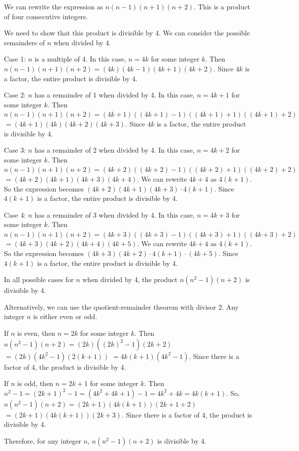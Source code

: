 \documentclass{article}
\begin{document}
We can rewrite the expression as $n(n-1)(n+1)(n+2)$. This is a product of four consecutive integers.

We need to show that this product is divisible by 4. We can consider the possible remainders of $n$ when divided by 4.

Case 1: $n$ is a multiple of 4.
In this case, $n = 4k$ for some integer $k$.
Then $n(n-1)(n+1)(n+2) = (4k)(4k-1)(4k+1)(4k+2)$.
Since $4k$ is a factor, the entire product is divisible by 4.

Case 2: $n$ has a remainder of 1 when divided by 4.
In this case, $n = 4k+1$ for some integer $k$.
Then $n(n-1)(n+1)(n+2) = (4k+1)((4k+1)-1)((4k+1)+1)((4k+1)+2)$
$= (4k+1)(4k)(4k+2)(4k+3)$.
Since $4k$ is a factor, the entire product is divisible by 4.

Case 3: $n$ has a remainder of 2 when divided by 4.
In this case, $n = 4k+2$ for some integer $k$.
Then $n(n-1)(n+1)(n+2) = (4k+2)((4k+2)-1)((4k+2)+1)((4k+2)+2)$
$= (4k+2)(4k+1)(4k+3)(4k+4)$.
We can rewrite $4k+4$ as $4(k+1)$.
So the expression becomes $(4k+2)(4k+1)(4k+3) \cdot 4(k+1)$.
Since $4(k+1)$ is a factor, the entire product is divisible by 4.

Case 4: $n$ has a remainder of 3 when divided by 4.
In this case, $n = 4k+3$ for some integer $k$.
Then $n(n-1)(n+1)(n+2) = (4k+3)((4k+3)-1)((4k+3)+1)((4k+3)+2)$
$= (4k+3)(4k+2)(4k+4)(4k+5)$.
We can rewrite $4k+4$ as $4(k+1)$.
So the expression becomes $(4k+3)(4k+2) \cdot 4(k+1) \cdot (4k+5)$.
Since $4(k+1)$ is a factor, the entire product is divisible by 4.

In all possible cases for $n$ when divided by 4, the product $n(n^2-1)(n+2)$ is divisible by 4.

Alternatively, we can use the quotient-remainder theorem with divisor 2.
Any integer $n$ is either even or odd.

If $n$ is even, then $n = 2k$ for some integer $k$.
Then $n(n^2 - 1)(n + 2) = (2k)((2k)^2 - 1)(2k + 2)$
$= (2k)(4k^2 - 1)(2(k + 1))$
$= 4k(k+1)(4k^2 - 1)$.
Since there is a factor of 4, the product is divisible by 4.

If $n$ is odd, then $n = 2k+1$ for some integer $k$.
Then $n^2 - 1 = (2k+1)^2 - 1 = (4k^2 + 4k + 1) - 1 = 4k^2 + 4k = 4k(k+1)$.
So, $n(n^2 - 1)(n + 2) = (2k+1)(4k(k+1))(2k+1 + 2)$
$= (2k+1)(4k(k+1))(2k+3)$.
Since there is a factor of 4, the product is divisible by 4.

Therefore, for any integer $n$, $n(n^2 - 1)(n + 2)$ is divisible by 4.

\newpage
\end{document}
